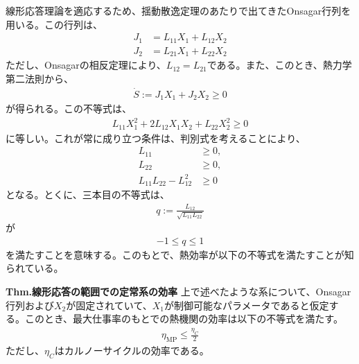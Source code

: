 \documentclass[a4paper,10.5pt]{jsarticle}
\numberwithin{equation}{section}
\begin{document}
線形応答理論を適応するため、揺動散逸定理のあたりで出てきたOnsagar行列を用いる。この行列は、
\begin{align}
    J_1 &= L_{11} X_1 + L_{12} X_2\\
    J_2 &= L_{21} X_1 + L_{22} X_2
\end{align}
ただし、Onsagarの相反定理により、$L_{12} = L_{21}$である。また、このとき、熱力学第二法則から、
\begin{align}
    \dot{S} := J_1 X_1 + J_2 X_2 \geq 0
\end{align}
が得られる。この不等式は、
\begin{align}
  L_{11} X_1^2 + 2L_{12} X_1 X_2 + L_{22} X_2^2 \geq 0
\end{align}
に等しい。これが常に成り立つ条件は、判別式を考えることにより、
\begin{align}
    L_{11} &\geq 0,  \\
    L_{22} &\geq 0,  \\
    L_{11}L_{22} - L_{12}^2 &\geq 0
\end{align}
となる。とくに、三本目の不等式は、
\begin{align}
    q := \frac{L_{12}}{\sqrt{L_{11}L_{22}}}
\end{align}
が
\begin{align}
  -1 \leq q \leq 1
\end{align}
を満たすことを意味する。このもとで、熱効率が以下の不等式を満たすことが知られている。

\begin{itembox}[l]{\textbf{Thm.線形応答の範囲での定常系の効率}}
  上で述べたような系について、Onsagar行列および$X_2$が固定されていて、$X_1$が制御可能なパラメータであると仮定する。このとき、最大仕事率のもとでの熱機関の効率は以下の不等式を満たす。
  \begin{align}
    \eta_{\text{MP}} \leq \frac{\eta_C}{2} 
  \end{align}
  ただし、$\eta_C$はカルノーサイクルの効率である。
\end{itembox}
\end{document}
